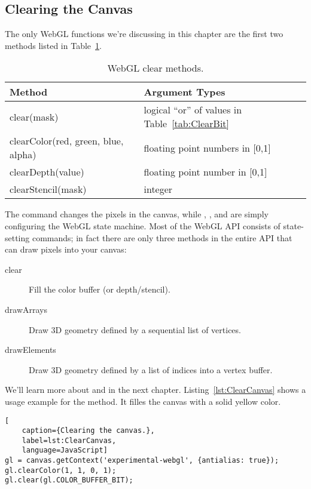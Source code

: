 
\subsection{Clearing the Canvas}

The only WebGL functions we're discussing in this chapter are the first two methods listed in Table~\ref{tab:Clearing}.

\begin{table}[htb]\centering
  \begin{tabular}{ll}
    \hline
    Method & Argument Types \\
    \hline
    clear(mask) & logical ``or'' of values in Table~\ref{tab:ClearBit} \\
    clearColor(red, green, blue, alpha)  & floating point numbers in [0,1] \\
    clearDepth(value) & floating point number in [0,1] \\
    clearStencil(mask) & integer \\
    \hline
  \end{tabular}
  \caption{WebGL clear methods.}
  \label{tab:Clearing}
\end{table}

The  command changes the pixels in the canvas, while , , and  are simply configuring the WebGL state machine.  Most of the WebGL API consists of state-setting commands; in fact there are only three methods in the entire API that can draw pixels into your canvas:

\begin{description}
\item[clear] Fill the color buffer (or depth/stencil).
\item[drawArrays] Draw 3D geometry defined by a sequential list of vertices.
\item[drawElements] Draw 3D geometry defined by a list of indices into a vertex buffer.
\end{description}

We'll learn more about  and  in the next chapter.  Listing~\ref{lst:ClearCanvas} shows a usage example for the  method.  It filles the canvas with a solid yellow color.

\begin{lstlisting}[
    caption={Clearing the canvas.},
    label=lst:ClearCanvas,
    language=JavaScript]
gl = canvas.getContext('experimental-webgl', {antialias: true});
gl.clearColor(1, 1, 0, 1);
gl.clear(gl.COLOR_BUFFER_BIT);
\end{lstlisting}


